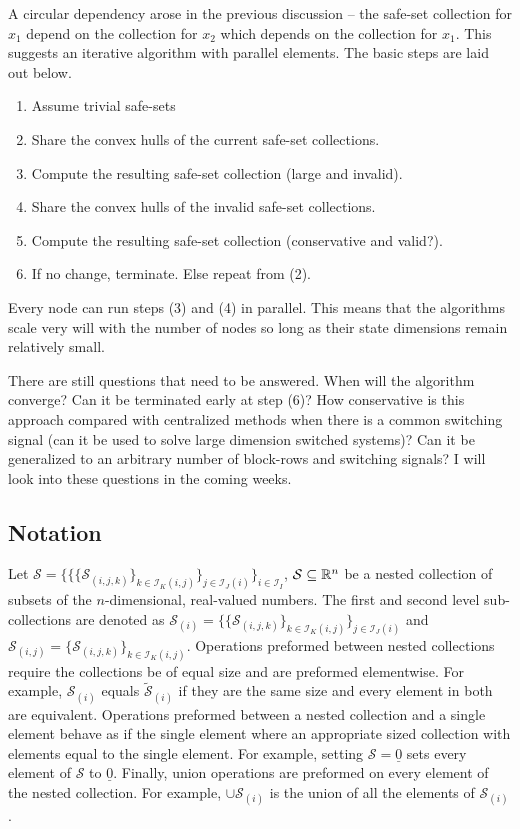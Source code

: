 A circular dependency arose in the previous discussion -- the safe-set collection for $x_1$ depend on the collection for $x_2$ which depends on the collection for $x_1$. This suggests an iterative algorithm with parallel elements. The basic steps are laid out below.
\begin{enumerate}
	\item Assume trivial safe-sets
	\item Share the convex hulls of the current safe-set collections.
	\item Compute the resulting safe-set collection (large and invalid).
	\item Share the convex hulls of the invalid safe-set collections.
	\item Compute the resulting safe-set collection (conservative and valid?).
	\item If no change, terminate. Else repeat from (2).
\end{enumerate} 
Every node can run steps (3) and (4) in parallel. This means that the algorithms scale very will with the number of nodes so long as their state dimensions remain relatively small.

There are still questions that need to be answered. When will the algorithm converge? Can it be terminated early at step (6)? How conservative is this approach compared with centralized methods when there is a common switching signal (can it be used to solve large dimension switched systems)? Can it be generalized to an arbitrary number of block-rows and switching signals? I will look into these questions in the coming weeks.

\subsection{Notation}
Let $\mathcal{S}=\{\{\{\mathcal{S}_{(i,j,k)}\}_{k\in\mathcal{I}_{K}(i,j)}\}_{j\in\mathcal{I}_{J}(i)}\}_{i\in\mathcal{I}_I}$, $\mathcal{S}\subseteq\mathbb{R}^n$ be a nested collection of subsets of the $n$-dimensional, real-valued numbers. The first and second level sub-collections are denoted as $\mathcal{S}_{(i)}=\{\{\mathcal{S}_{(i,j,k)}\}_{k\in\mathcal{I}_{K}(i,j)}\}_{j\in\mathcal{I}_{J}(i)}$ and $\mathcal{S}_{(i,j)}=\{\mathcal{S}_{(i,j,k)}\}_{k\in\mathcal{I}_{K}(i,j)}$. Operations preformed between nested collections require the collections be of equal size and are preformed elementwise. For example, $\mathcal{S}_{(i)}$ equals $\tilde{\mathcal{S}}_{(i)}$ if they are the same size and every element in both are equivalent. Operations preformed between a nested collection and a single element behave as if the single element where an appropriate sized collection with elements equal to the single element. For example, setting $\mathcal{S}=\underline{0}$ sets every element of $\mathcal{S}$ to $\underline{0}$. Finally, union operations are preformed on every element of the nested collection. For example, $\cup \mathcal{S}_{(i)}$ is the union of all the elements of $\mathcal{S}_{(i)}$.